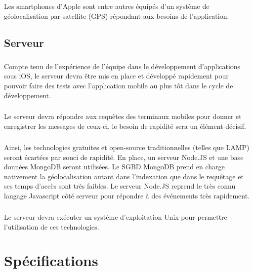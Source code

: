 \documentclass[a4paper,12pt]{report}
\begin{document}
\begin{onehalfspace}
	\paragraph*{}
	Les smartphones d'Apple sont entre autres équipés d'un système de géolocalisation par satellite (GPS) répondant aux besoins de l'application.

	\section{Serveur}
	
	\paragraph*{}
	Compte tenu de l'expérience de l'équipe dans le développement d'applications sous iOS, le serveur devra être mis en place et développé rapidement pour pouvoir faire des tests avec l'application mobile au plus tôt dans le cycle de développement.

	\paragraph*{}
	Le serveur devra répondre aux requêtes des terminaux mobiles pour donner et enregistrer les messages de ceux-ci, le besoin de rapidité sera un élément décisif.
	
	\paragraph*{}
	Ainsi, les technologies gratuites et open-source traditionnelles (telles que LAMP) seront écartées par souci de rapidité. En place, un serveur Node.JS et une base données MongoDB seront utilisées.
	Le SGBD MongoDB prend en charge nativement la géolocalisation autant dans l’indexation que dans le requêtage et ses temps d'accès sont très faibles.
	Le serveur Node.JS reprend le très connu langage Javascript côté serveur pour répondre à des événements très rapidement.
	
	\paragraph*{}
	Le serveur devra exécuter un système d'exploitation Unix pour permettre l'utilisation de ces technologies.
	
	
	\chapter*{Spécifications}


\end{onehalfspace}
\end{document}
